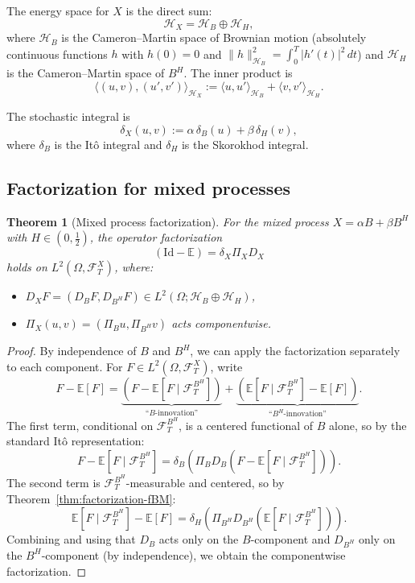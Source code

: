\documentclass[11pt,a4paper]{article}
\theoremstyle{plain}
\newtheorem{theorem}{Theorem}[section]
\theoremstyle{definition}
\theoremstyle{remark}
\newcommand{\E}{\mathbb{E}}
\newcommand{\Id}{\mathrm{Id}}
\newcommand{\ip}[2]{\langle #1, #2 \rangle}
\newcommand{\norm}[1]{\| #1 \|}
\newcommand{\Lp}[1]{L^{#1}}
\newcommand{\FT}{\mathcal{F}_T}
\newcommand{\HH}{\mathcal{H}_H}
\newcommand{\HX}{\mathcal{H}_X}
\begin{document}
The energy space for $X$ is the direct sum:
\[
\HX = \mathcal{H}_B \oplus \HH,
\]
where $\mathcal{H}_B$ is the Cameron--Martin space of Brownian motion (absolutely continuous functions $h$ with $h(0) = 0$ and $\norm{h}_{\mathcal{H}_B}^2 = \int_0^T |h'(t)|^2 \, dt$) and $\HH$ is the Cameron--Martin space of $B^H$. The inner product is
\[
\ip{(u,v)}{(u',v')}_{\HX} := \ip{u}{u'}_{\mathcal{H}_B} + \ip{v}{v'}_{\HH}.
\]

The stochastic integral is
\[
\delta_X(u, v) := \alpha \, \delta_B(u) + \beta \, \delta_H(v),
\]
where $\delta_B$ is the It\^o integral and $\delta_H$ is the Skorokhod integral.

\subsection{Factorization for mixed processes}

\begin{theorem}[Mixed process factorization]\label{thm:mixed}
For the mixed process $X = \alpha B + \beta B^H$ with $H \in (0, \frac{1}{2})$, the operator factorization
\[
(\Id - \E) = \delta_X \Pi_X D_X
\]
holds on $\Lp{2}(\Omega, \FT^X)$, where:
\begin{itemize}
\item $D_X F = (D_B F, D_{B^H} F) \in \Lp{2}(\Omega; \mathcal{H}_B \oplus \HH)$,
\item $\Pi_X(u, v) = (\Pi_B u, \Pi_{B^H} v)$ acts componentwise.
\end{itemize}
\end{theorem}

\begin{proof}
By independence of $B$ and $B^H$, we can apply the factorization separately to each component. For $F \in \Lp{2}(\Omega, \FT^X)$, write
\[
F - \E[F] = \underbrace{(F - \E[F \mid \mathcal{F}_T^{B^H}])}_{\text{``$B$-innovation''}} + \underbrace{(\E[F \mid \mathcal{F}_T^{B^H}] - \E[F])}_{\text{``$B^H$-innovation''}}.
\]
The first term, conditional on $\mathcal{F}_T^{B^H}$, is a centered functional of $B$ alone, so by the standard It\^o representation:
\[
F - \E[F \mid \mathcal{F}_T^{B^H}] = \delta_B(\Pi_B D_B(F - \E[F \mid \mathcal{F}_T^{B^H}])).
\]
The second term is $\mathcal{F}_T^{B^H}$-measurable and centered, so by Theorem~\ref{thm:factorization-fBM}:
\[
\E[F \mid \mathcal{F}_T^{B^H}] - \E[F] = \delta_H(\Pi_{B^H} D_{B^H}(\E[F \mid \mathcal{F}_T^{B^H}])).
\]
Combining and using that $D_B$ acts only on the $B$-component and $D_{B^H}$ only on the $B^H$-component (by independence), we obtain the componentwise factorization.
\end{proof}
\end{document}
